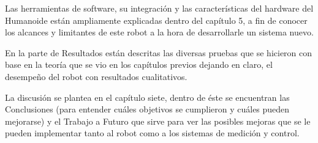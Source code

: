	Las herramientas de software, su integración y las características del hardware del Humanoide están ampliamente explicadas dentro del capítulo 5, a fin de conocer los alcances y limitantes de este robot a la hora de desarrollarle un sistema nuevo.
	
	En la parte de Resultados están descritas las diversas pruebas que se hicieron con base en la teoría que se vio en los capítulos previos dejando en claro, el desempeño del robot con resultados cualitativos.
	
	La discusión se plantea en el capítulo siete, dentro de éste se encuentran las Conclusiones (para entender cuáles objetivos se cumplieron y cuáles pueden mejorarse) y el Trabajo a Futuro que sirve para ver las posibles mejoras que se le pueden implementar tanto al robot como a los sistemas de medición y control.